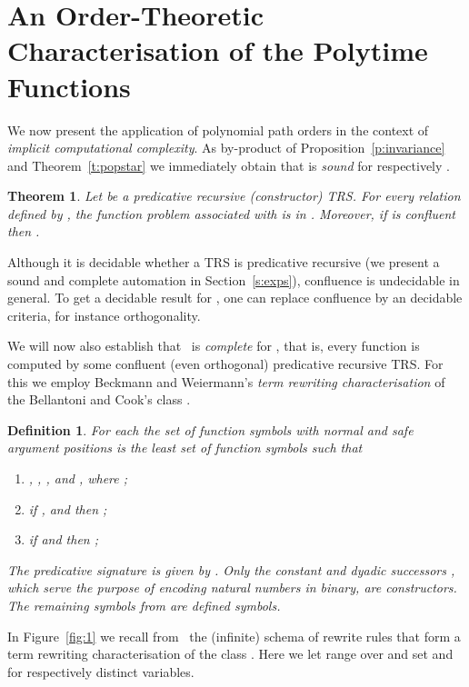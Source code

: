 \documentclass{LMCS}
\newtheorem{definition}[thm]{Definition}
\newtheorem{theorem}[thm]{Theorem}
\begin{document}
\section{An Order-Theoretic Characterisation of the Polytime Functions}\label{s:icc}

We now present the application of polynomial path orders
in the context of \emph{implicit computational complexity}.
As by-product of Proposition~\ref{p:invariance} and Theorem~\ref{t:popstar} we immediately obtain
that  is \emph{sound} for  respectively .
\begin{theorem}\label{t:icc:soundness}
Let  be a predicative recursive (constructor) TRS.\@ 
  For every relation  defined by , 
  the function problem  associated with  is in .
  Moreover, if  is confluent then .
\end{theorem}

Although it is decidable whether a TRS  is predicative recursive (we 
present a sound and complete automation in Section~\ref{s:exps}), 
confluence is undecidable in general. To get a decidable result for , 
one can replace confluence by an decidable criteria, for instance orthogonality. 

We will now also establish that \POPSTAR\ is \emph{complete} for , that is, 
every function  is computed by some confluent (even orthogonal) 
predicative recursive TRS.\@
For this we employ Beckmann and Weiermann's \emph{term rewriting characterisation} of the 
Bellantoni and Cook's class .

\begin{definition}{\cite[Definition~2.2]{BW96}}
\label{d:Rb}
For each  the set of function symbols  
with  normal and  safe argument positions is the 
least set of function symbols such that
\begin{enumerate}[labelsep=*,leftmargin=*]
\item , , , 
  and , where ; 
\item if , 
  and  then ; 
\item if  and  then ; 
\end{enumerate}
The \emph{predicative signature} is given by .
Only the constant  and \emph{dyadic successors} , 
which serve the purpose of encoding natural numbers in binary, 
are constructors. The remaining symbols from  are defined symbols.
\end{definition}

In Figure~\ref{fig:1} we recall from~\cite[Definition~2.7]{BW96} 
the (infinite) schema of rewrite rules  that 
form a term rewriting characterisation of the class .
Here we let  range over  and set
 and 
 for  respectively  distinct variables. 
\end{document}
